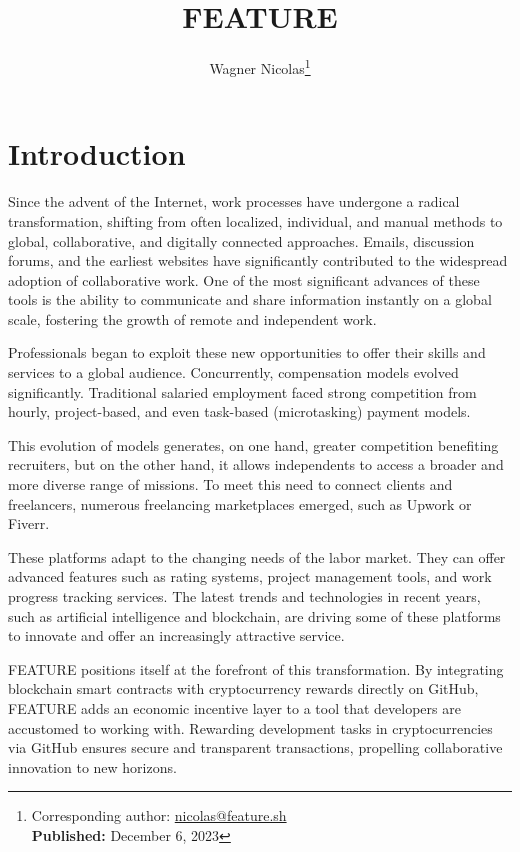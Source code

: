 \documentclass[
	a4paper, %
	10pt, %
	unnumberedsections, %
	twoside, %
]{LTJournalArticle}
\title{FEATURE} %
\author{%
	Wagner Nicolas\thanks{Corresponding author: \href{mailto:nicolas@feature.sh}{nicolas@feature.sh}\\ \textbf{Published:} December 6, 2023}
}
\begin{document}
\maketitle %


\section{Introduction}

Since the advent of the Internet, work processes have undergone a radical transformation, shifting from often localized, individual, and manual methods to global, collaborative, and digitally connected approaches. Emails, discussion forums, and the earliest websites have significantly contributed to the widespread adoption of collaborative work. One of the most significant advances of these tools is the ability to communicate and share information instantly on a global scale, fostering the growth of remote and independent work.

Professionals began to exploit these new opportunities to offer their skills and services to a global audience. Concurrently, compensation models evolved significantly. Traditional salaried employment faced strong competition from hourly, project-based, and even task-based (microtasking) payment models.

This evolution of models generates, on one hand, greater competition benefiting recruiters, but on the other hand, it allows independents to access a broader and more diverse range of missions. To meet this need to connect clients and freelancers, numerous freelancing marketplaces emerged, such as Upwork or Fiverr.

These platforms adapt to the changing needs of the labor market. They can offer advanced features such as rating systems, project management tools, and work progress tracking services. The latest trends and technologies in recent years, such as artificial intelligence and blockchain, are driving some of these platforms to innovate and offer an increasingly attractive service.

FEATURE positions itself at the forefront of this transformation. By integrating blockchain smart contracts with cryptocurrency rewards directly on GitHub, FEATURE adds an economic incentive layer to a tool that developers are accustomed to working with. Rewarding development tasks in cryptocurrencies via GitHub ensures secure and transparent transactions, propelling collaborative innovation to new horizons.
\end{document}
